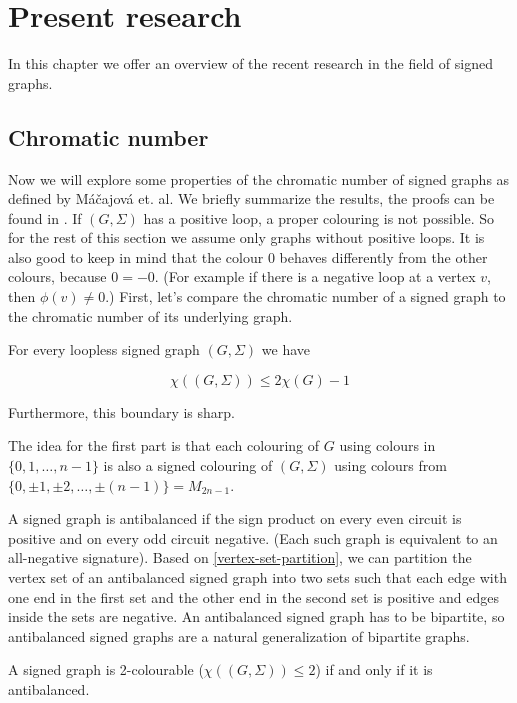 \chapter{Present research}\label{present-research}

In this chapter we offer an overview of the recent research in the field of signed graphs.

\section{Chromatic number}

Now we will explore some properties of the chromatic number of signed graphs as defined by Máčajová et. al. We briefly summarize the results, the proofs can be found in \cite{chromatic-number}.
If $(G, \Sigma)$ has a positive loop, a proper colouring is not possible. So for the rest of this section we assume
only graphs without positive loops. It is also good to keep in mind that the colour $0$ behaves differently from the other colours, because $0 = -0$.
(For example if there is a negative loop at a vertex $v$, then $\phi (v) \neq 0$.)
First, let's compare the chromatic number of a signed graph to the chromatic number of its underlying graph.

\begin{theorem}[Máčajová et. al.]
    For every loopless signed graph $(G, \Sigma)$ we have

    $$\chi ((G, \Sigma)) \leq 2 \chi (G) - 1$$

    Furthermore, this boundary is sharp.
\end{theorem}

The idea for the first part is that each colouring of $G$ using colours in $\{0, 1, \dots, n-1\}$
is also a signed colouring of $(G, \Sigma)$ using colours from $\{0, \pm 1, \pm 2, \dots, \pm (n-1)\} = M_{2n-1}$.

A signed graph is antibalanced if the sign product on every even circuit is positive and on every odd circuit negative.
(Each such graph is equivalent to an all-negative signature). Based on \cref{vertex-set-partition}, we can partition the
vertex set of an antibalanced signed graph into two sets such that each edge with one end in the first set and the other end in the second set is positive and edges inside the sets are negative.
An antibalanced signed graph has to be bipartite, so antibalanced signed graphs are a natural generalization of bipartite graphs.

\begin{proposition}[Máčajová et. al.]
    A signed graph is 2-colourable ($\chi ((G, \Sigma)) \leq 2$) if and only if it is antibalanced.
\end{proposition}

